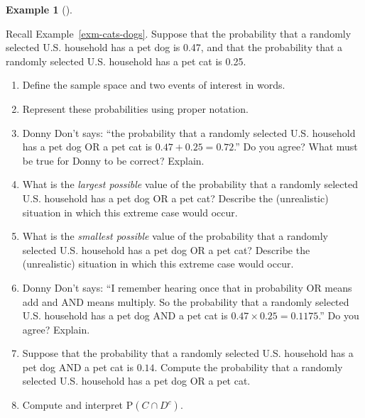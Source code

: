 \documentclass[
  letterpaper,
  DIV=11,
  numbers=noendperiod]{scrreprt}
\providecommand{\tightlist}{%
  \setlength{\itemsep}{0pt}\setlength{\parskip}{0pt}}
\theoremstyle{plain}
\theoremstyle{definition}
\newtheorem{example}{Example}[chapter]
\theoremstyle{definition}
\theoremstyle{definition}
\theoremstyle{remark}
\begin{document}
\begin{tcolorbox}[enhanced jigsaw, opacityback=0, left=2mm, colframe=quarto-callout-note-color-frame, toprule=.15mm, breakable, colback=white, leftrule=.75mm, arc=.35mm, rightrule=.15mm, bottomrule=.15mm]

\begin{example}[]\protect\hypertarget{exm-largest-smallest-prob}{}\label{exm-largest-smallest-prob}

Recall Example~\ref{exm-cats-dogs}. Suppose that the probability that a
randomly selected U.S. household has a pet dog is 0.47, and that the
probability that a randomly selected U.S. household has a pet cat is
0.25.

\begin{enumerate}
\def\labelenumi{\arabic{enumi}.}
\tightlist
\item
  Define the sample space and two events of interest in words.
\item
  Represent these probabilities using proper notation.
\item
  Donny Don't says: ``the probability that a randomly selected U.S.
  household has a pet dog OR a pet cat is \(0.47 + 0.25=0.72\).'' Do you
  agree? What must be true for Donny to be correct? Explain.
\item
  What is the \emph{largest possible} value of the probability that a
  randomly selected U.S. household has a pet dog OR a pet cat? Describe
  the (unrealistic) situation in which this extreme case would occur.
\item
  What is the \emph{smallest possible} value of the probability that a
  randomly selected U.S. household has a pet dog OR a pet cat? Describe
  the (unrealistic) situation in which this extreme case would occur.
\item
  Donny Don't says: ``I remember hearing once that in probability OR
  means add and AND means multiply. So the probability that a randomly
  selected U.S. household has a pet dog AND a pet cat is
  \(0.47 \times 0.25=0.1175\).'' Do you agree? Explain.
\item
  Suppose that the probability that a randomly selected U.S. household
  has a pet dog AND a pet cat is \(0.14\). Compute the probability that
  a randomly selected U.S. household has a pet dog OR a pet cat.
\item
  Compute and interpret \(\textrm{P}(C \cap D^c)\).
\end{enumerate}

\end{example}

\end{tcolorbox}
\end{document}

